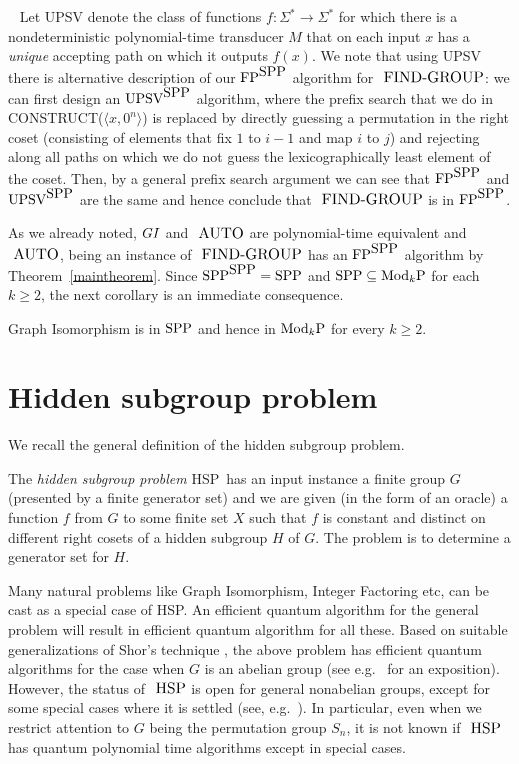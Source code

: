 \documentclass{elsart}
\newenvironment{remark}{\begin{trivlist}%
\item[\hskip\labelsep{\bf Remark.}]~}{\end{trivlist}}
\newcommand{\FP}{\mbox{\rm FP}}
\newcommand{\ModkP}{\mbox{\rm Mod$_k$P}}
\newcommand{\UPSV}{\mbox{\rm UPSV}}
\newcommand{\SPP}{\mbox{\rm SPP}}
\newcommand{\AUTO}{\mbox{\small\rm AUTO}}
\newcommand{\FINDGROUP}{\mbox{\small\rm FIND{-}GROUP}}
\newcommand{\HSP}{\mbox{\small\rm HSP}}
\newcommand{\GI}{{\rm{GI}}}
\renewcommand{\angle}[1]{\langle #1\rangle}
\begin{document}
\begin{remark}
  Let UPSV denote the class of functions
  $f:\Sigma^*\longrightarrow\Sigma^*$ for which there is a
  nondeterministic polynomial-time transducer $M$ that on each input
  $x$ has a \emph{unique} accepting path on which it outputs $f(x)$.
  We note that using UPSV there is alternative description of our
  $\FP^{\SPP}$ algorithm for $\FINDGROUP$: we can first design an
  $\UPSV^{\SPP}$ algorithm, where the prefix search that we do in
  CONSTRUCT($\angle{x,0^n}$) is replaced by directly guessing a
  permutation in the right coset (consisting of elements that fix $1$
  to $i-1$ and map $i$ to $j$) and rejecting along all paths on which
  we do not guess the lexicographically least element of the coset.
  Then, by a general prefix search argument we can see that
  $\FP^{\SPP}$ and $\UPSV^{\SPP}$ are the same and hence conclude that
  $\FINDGROUP$ is in $\FP^{\SPP}$.
\end{remark}

As we already noted, $\GI$ and $\AUTO$ are polynomial-time equivalent
and $\AUTO$, being an instance of $\FINDGROUP$ has an $\FP^{\SPP}$
algorithm by Theorem~\ref{maintheorem}. Since $\SPP^{\SPP}=\SPP$ and
$\SPP\subseteq\ModkP$ for each $k\geq 2$, the next corollary is an
immediate consequence.

\begin{cor}
  Graph Isomorphism is in $\SPP$ and hence in $\ModkP$ for every
  $k\geq 2$.
\end{cor}

\section{Hidden subgroup problem}\label{hsp-section}

We recall the general definition of the hidden subgroup problem.

\begin{defn}\label{hsp}
  The {\em hidden subgroup problem} \HSP\ has an input instance a
  finite group $G$ (presented by a finite generator set) and we are
  given (in the form of an oracle) a function $f$ from $G$ to some
  finite set $X$ such that $f$ is constant and distinct on different
  right cosets of a hidden subgroup $H$ of $G$. The problem is to
  determine a generator set for $H$.
\end{defn}

Many natural problems like Graph Isomorphism, Integer Factoring etc,
can be cast as a special case of \HSP. An efficient quantum algorithm
for the general problem will result in efficient quantum algorithm for
all these. Based on suitable generalizations of Shor's technique
\cite{shor97polynomialtime}, the above problem has efficient quantum
algorithms for the case when $G$ is an abelian group (see
e.g.~\cite{moscaphd} for an exposition).  However, the status of
$\HSP$ is open for general nonabelian groups, except for some special
cases where it is settled (see, e.g.\
\cite{hallgren00normal,ivanyos01efficient}). In particular, even when
we restrict attention to $G$ being the permutation group $S_n$, it is
not known if $\HSP$ has quantum polynomial time algorithms except in
special cases.
\end{document}

